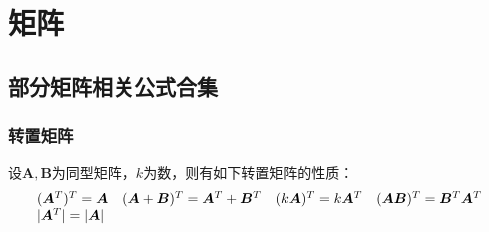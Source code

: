 \documentclass[12pt, a4paper, oneside, UTF8]{ctexbook}
\begin{document}
% 
\else
\fi
\chapter{矩阵}
\section{部分矩阵相关公式合集}
\subsection{转置矩阵}
\begin{theorem}
    设$\bm{A}, \bm{B}$为同型矩阵，$k$为数，则有如下转置矩阵的性质：
    \[
        \begin{array}{l@{\quad}l@{\quad}l@{\quad}l}
        (\bm{A}^T)^{T} = \bm{A} &(\bm{A} + \bm{B})^T = \bm{A}^T + \bm{B}^T & (k\bm{A})^T = k\bm{A}^T &(\bm{A}\bm{B})^T = \bm{B}^T \bm{A}^T\\
        |\bm{A}^T| = |\bm{A}| 
        \end{array}
    \]
\end{theorem}
\end{document}
